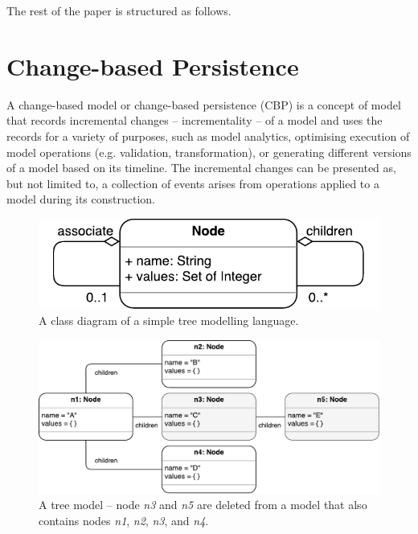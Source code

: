 \documentclass[sigconf]{acmart}
\begin{document}
The rest of the paper is structured as follows. %

\section{Change-based Persistence}
\label{sec:change_based_persistence}
A change-based model or change-based persistence (CBP) is a concept of model that records incremental changes -- incrementality -- of a model and uses the records for a variety of purposes, such as model analytics, optimising execution of model operations (e.g. validation, transformation), or generating different versions of a model based on its timeline. The incremental changes can be presented as, but not limited to, a collection of events arises from operations applied to a model during its construction. 

\begin{figure}[ht]
\centering
\includegraphics[scale=0.5]{node_metamodel}
\caption{A class diagram of a simple tree modelling language.}
\label{fig:node_metamodel}
\end{figure}

\begin{figure}[ht]
\centering
\includegraphics[width=\linewidth]{initial_chart}
\caption{A tree model -- node \emph{n3} and \emph{n5} are deleted from a model that also contains nodes \emph{n1}, \emph{n2}, \emph{n3}, and \emph{n4}.}
\label{fig:initial_model}
\end{figure}
\end{document}
